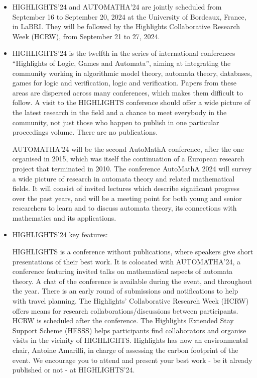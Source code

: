 \documentclass[prodmode,acmtecs]{acmsmall} %
\begin{document}
\begin{itemize}\item  HIGHLIGHTS’24 and AUTOMATHA’24 are jointly scheduled from September 16 to September 20, 2024 at the University of Bordeaux, France, in LaBRI. They will be followed by the Highlights Collaborative Research Week (HCRW), from September 21 to 27, 2024. 
 
\item  HIGHLIGHTS’24 is the twelfth in the series of international conferences “Highlights of Logic, Games and Automata”, aiming at integrating the community working in algorithmic model theory, automata theory, databases, games for logic and verification, logic and verification. Papers from these areas are dispersed across many conferences, which makes them difficult to follow. A visit to the HIGHLIGHTS conference should offer a wide picture of the latest research in the field and a chance to meet everybody in the community, not just those who happen to publish in one particular proceedings volume. There are no publications. 
 
  AUTOMATHA’24 will be the second AutoMathA conference, after the one organised in 2015, which was itself the continuation of a European research project that terminated in 2010. The conference AutoMathA 2024 will survey a wide picture of research in automata theory and related mathematical fields. It will consist of invited lectures which describe significant progress over the past years, and will be a meeting point for both young and senior researchers to learn and to discuss automata theory, its connections with mathematics and its applications. 
 
\item  HIGHLIGHTS’24 key features: 
 
  HIGHLIGHTS is a conference without publications, where speakers give short presentations of their best work. It is colocated with AUTOMATHA’24, a conference featuring invited talks on mathematical aspects of automata theory. A chat of the conference is available during the event, and throughout the year. There is an early round of submissions and notifications to help with travel planning. The Highlights’ Collaborative Research Week (HCRW) offers means for research collaborations/discussions between participants. HCRW is scheduled after the conference. The Highlights Extended Stay Support Scheme (HESSS) helps participants find collaborators and organise visits in the vicinity of HIGHLIGHTS. Highlights has now an environmental chair, Antoine Amarilli, in charge of assessing the carbon footprint of the event. We encourage you to attend and present your best work - be it already published or not - at HIGHLIGHTS’24.  
 

\end{itemize}
\end{document}
